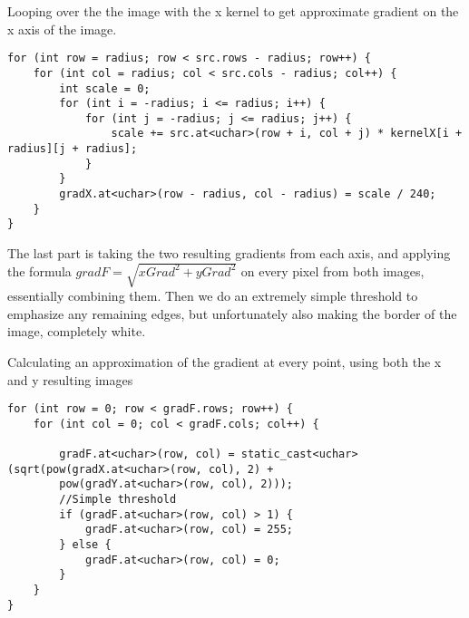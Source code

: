 \begin{listing}[H]
	\caption{Looping over the the image with the x kernel to get approximate gradient on the x axis of the image.}
	\label{listing:xLoop}
	\begin{verbatim}
for (int row = radius; row < src.rows - radius; row++) {
	for (int col = radius; col < src.cols - radius; col++) {
		int scale = 0;
		for (int i = -radius; i <= radius; i++) {
			for (int j = -radius; j <= radius; j++) {
				scale += src.at<uchar>(row + i, col + j) * kernelX[i + radius][j + radius];
			}
		}
		gradX.at<uchar>(row - radius, col - radius) = scale / 240;
	}
}
	\end{verbatim}
\end{listing}

The last part is taking the two resulting gradients from each axis, and applying the formula $gradF = \sqrt{xGrad^2+yGrad^2}$ on every pixel from both images, essentially combining them. Then we do an extremely simple threshold to emphasize any remaining edges, but unfortunately also making the border of the image, completely white.

\begin{listing}[H]
	\caption{Calculating an approximation of the gradient at every point, using both the x and y resulting images}
	\label{listing:finalGradient}
	\begin{verbatim}
for (int row = 0; row < gradF.rows; row++) {
	for (int col = 0; col < gradF.cols; col++) {
		
		gradF.at<uchar>(row, col) = static_cast<uchar>(sqrt(pow(gradX.at<uchar>(row, col), 2) +
		pow(gradY.at<uchar>(row, col), 2)));
		//Simple threshold
		if (gradF.at<uchar>(row, col) > 1) {
			gradF.at<uchar>(row, col) = 255;
		} else {
			gradF.at<uchar>(row, col) = 0;
		}
	}
}
	\end{verbatim}
\end{listing}
